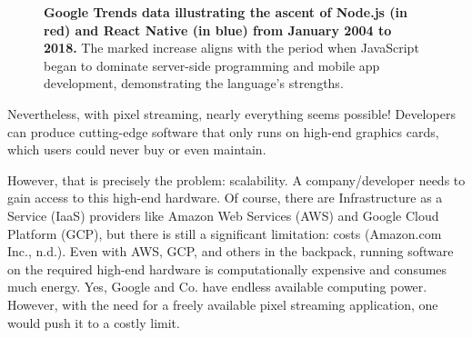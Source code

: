 \documentclass[10pt]{article}
\begin{document}
\begin{sloppypar}
  \begin{figure}[ht]
    \centering
    \caption[Google Trends data illustrating the ascent of Node.js and React Native.]{\textbf{Google Trends data illustrating the ascent of Node.js (in red) and React Native (in blue) from January 2004 to 2018.} The marked increase aligns with the period when JavaScript began to dominate server-side programming and mobile app development, demonstrating the language’s strengths.}
    \label{fig:pixel-streaming-architecture}
  \end{figure}

  Nevertheless, with pixel streaming, nearly everything seems possible! Developers can produce cutting-edge software that only runs on high-end graphics cards, which users could never buy or even maintain.

  However, that is precisely the problem: scalability. A company/developer needs to gain access to this high-end hardware. Of course, there are Infrastructure as a Service (IaaS) providers like Amazon Web Services (AWS) and Google Cloud Platform (GCP), but there is still a significant limitation: costs (Amazon.com Inc., n.d.). Even with AWS, GCP, and others in the backpack, running software on the required high-end hardware is computationally expensive and consumes much energy. Yes, Google and Co. have endless available computing power. However, with the need for a freely available pixel streaming application, one would push it to a costly limit.


\end{sloppypar}
\end{document}
